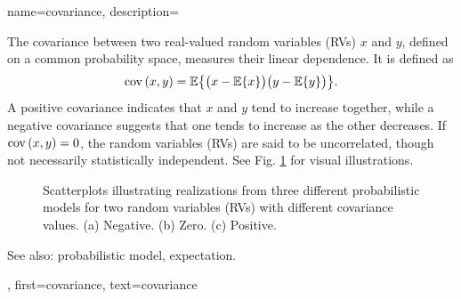 {
{name={covariance}, 
	description={The covariance between two real-valued 
 		random variables (RVs) $x$ and $y$, defined on a common probability space, measures their linear 
 		dependence. It is defined as 
			$$
			{\rm cov}\left(x,y\right) = \mathbb{E} \big\{ \big(x - \mathbb{E} \{ x\} \big)\big(y - \mathbb{E} \{y\} \big)\big\}.
			$$
		A positive covariance indicates that $x$ and $y$ tend to increase together, 
		while a negative covariance suggests that one tends to increase as the other decreases. 
		If ${\rm cov}\left(x,y\right) = 0$, the random variables (RVs) are said to be uncorrelated, though not necessarily statistically 
		independent. See Fig. \ref{fig:covariance-examples_dict} for visual illustrations.
		\begin{figure}[H]
			\caption{Scatterplots illustrating realizations from three different probabilistic models for two 
				random variables (RVs) with different covariance values. (a) Negative. (b) Zero. (c) Positive.}
			\label{fig:covariance-examples_dict}
		\end{figure}
		See also: probabilistic model, expectation. },
	first={covariance},
	text={covariance} 
}

}
